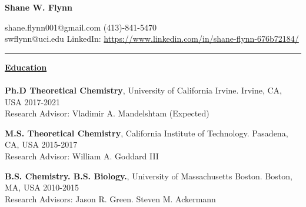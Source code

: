 \documentclass[letterpaper]{article}
\def\name{Shane W. Flynn}
\begin{document}
\centerline{\huge \textbf{\name}}
\vspace{0.1in}
shane.flynn001@gmail.com \hfill (413)-841-5470\\
swflynn@uci.edu \hfill LinkedIn: \url{https://www.linkedin.com/in/shane-flynn-676b72184/}
\hrule
\vspace{0.15in}
{\large \textbf{\underline{Education}}}\\
\vspace{-0.2in}\\

\textbf{Ph.D  Theoretical Chemistry}, University of California Irvine.
Irvine, CA, USA  \hfill 2017-2021\\
Research Advisor: Vladimir A. Mandelshtam \null \hfill (Expected)\\
\vspace{-0.1in}

\textbf{M.S. Theoretical Chemistry}, California Institute of Technology.
Pasadena, CA, USA  \hfill 2015-2017 \\
Research Advisor: William A. Goddard III\\
\vspace{-0.1in}

\textbf{B.S. Chemistry. B.S. Biology.}, University of
Massachusetts Boston.
Boston, MA, USA  \hfill 2010-2015 \\
Research Advisors: Jason R. Green. Steven M. Ackermann\\
%
\end{document}
